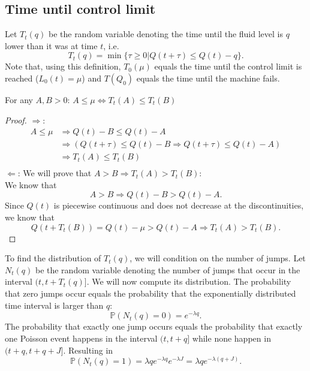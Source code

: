 \subsection{Time until control limit}
Let $T_t(q)$ be the random variable denoting the time until the fluid level is $q$ lower than it was at time $t$, i.e.
$$
T_t(q)=\min\{\tau\geq0|Q(t+\tau)\leq Q(t)-q\}.
$$
Note that, using this definition, $T_0(\mu)$ equals the time until the control limit is reached ($L_0(t)=\mu$) and $T(Q_0)$ equals the time until the machine fails.
\begin{lemma}\label{lemma:TimeUntilFluidLemma}
	For any $A,B>0$:
	$A\leq\mu\Leftrightarrow T_t(A)\leq T_t(B)$
	\begin{proof}
		$\Rightarrow$: 
		\[\begin{split}
		A\leq\mu&\Rightarrow Q(t)-B\leq Q(t)-A\\
		&\Rightarrow (Q(t+\tau)\leq Q(t)-B\Rightarrow Q(t+\tau)\leq Q(t)-A)\\
		&\Rightarrow T_t(A)\leq T_t(B)\\
		\end{split}\]
		$\Leftarrow$: We will prove that $A>B\Rightarrow T_t(A)> T_t(B)$:\\
		We know that
		$$
		A>B\Rightarrow Q(t)-B > Q(t)-A.
		$$
		Since $Q(t)$ is piecewise continuous and does not decrease at the discontinuities, we know that 
		$$
		Q(t+T_t(B))=Q(t)-\mu>Q(t)-A\Rightarrow T_t(A)> T_t(B).
		$$
	\end{proof}
\end{lemma}
To find the distribution of $T_t(q)$, we will condition on the number of jumps.
Let $N_t(q)$ be the random variable denoting the number of jumps that occur in the interval $(t,t+T_t(q)]$.
We will now compute its distribution.
The probability that zero jumps occur equals the probability that the exponentially distributed time interval is larger than $q$:
$$
\mathbb{P}(N_t(q)=0)=e^{-\lambda q}.
$$
The probability that exactly one jump occurs equals the probability that exactly one Poisson event happens in the interval $(t,t+q]$ while none happen in $(t+q,t+q+J]$. Resulting in
$$
\mathbb{P}(N_t(q)=1)=\lambda q e^{-\lambda q} e^{-\lambda J}=\lambda q e^{-\lambda (q+J)}.
$$

